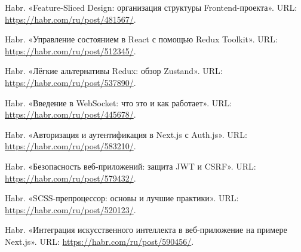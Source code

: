 \begin{thebibliography}{99}
    Habr. «Feature-Sliced Design: организация структуры Frontend-проекта». URL: \url{https://habr.com/ru/post/481567/}.

    Habr. «Управление состоянием в React с помощью Redux Toolkit». URL: \url{https://habr.com/ru/post/512345/}.

    Habr. «Лёгкие альтернативы Redux: обзор Zustand». URL: \url{https://habr.com/ru/post/537890/}.

    Habr. «Введение в WebSocket: что это и как работает». URL: \url{https://habr.com/ru/post/445678/}.

    Habr. «Авторизация и аутентификация в Next.js с Auth.js». URL: \url{https://habr.com/ru/post/583210/}.

    Habr. «Безопасность веб-приложений: защита JWT и CSRF». URL: \url{https://habr.com/ru/post/579432/}.

    Habr. «SCSS-препроцессор: основы и лучшие практики». URL: \url{https://habr.com/ru/post/520123/}.

    Habr. «Интеграция искусственного интеллекта в веб-приложение на примере Next.js». URL: \url{https://habr.com/ru/post/590456/}.

  \end{thebibliography}
\endgroup
